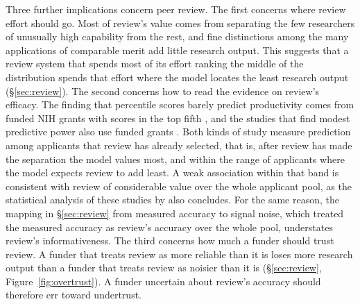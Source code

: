 \documentclass[article, 11pt, reqno]{amsart}
\theoremstyle{named}
\begin{document}
Three further implications concern peer review. The first concerns where review effort should go. Most of review's value comes from separating the few researchers of unusually high capability from the rest, and fine distinctions among the many applications of comparable merit add little research output. This suggests that a review system that spends most of its effort ranking the middle of the distribution spends that effort where the model locates the least research output (\S\ref{sec:review}). The second concerns how to read the evidence on review's efficacy. The finding that percentile scores barely predict productivity comes from funded NIH grants with scores in the top fifth \citep{Fang2016}, and the studies that find modest predictive power also use funded grants \citep{LiAgha2015}. Both kinds of study measure prediction among applicants that review has already selected, that is, after review has made the separation the model values most, and within the range of applicants where the model expects review to add least. A weak association within that band is consistent with review of considerable value over the whole applicant pool, as the statistical analysis of these studies by \citet{LindnerNakamura2015} also concludes. For the same reason, the mapping in \S\ref{sec:review} from measured accuracy to signal noise, which treated the measured accuracy as review's accuracy over the whole pool, understates review's informativeness. The third concerns how much a funder should trust review. A funder that treats review as more reliable than it is loses more research output than a funder that treats review as noisier than it is (\S\ref{sec:review}, Figure~\ref{fig:overtrust}). A funder uncertain about review's accuracy should therefore err toward undertrust.
\end{document}
